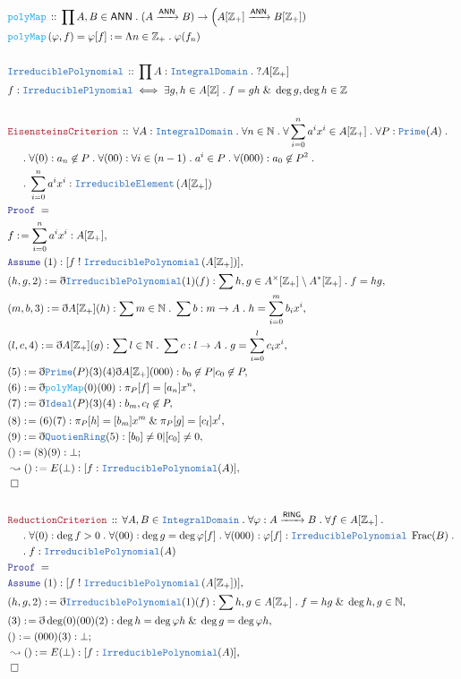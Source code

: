 \documentclass[12pt]{scrartcl}
\newcommand{\TYPE}[1]{\textcolor{NavyBlue}{\mathtt{#1}}}
\newcommand{\FUNC}[1]{\textcolor{Cerulean}{\mathtt{#1}}}
\newcommand{\LOGIC}[1]{\textcolor{Blue}{\mathtt{#1}}}
\newcommand{\THM}[1]{\textcolor{Maroon}{\mathtt{#1}}}
\renewcommand{\.}{\; . \;}
\newcommand{\de}{: \kern 0.1pc =}
\newcommand{\IsNot}{\; ! \;}
\newcommand{\Act}[1]{\left( #1 \right)}
\newcommand{\Theorem}[2]{& \THM{#1} \, :: \, #2 \\ & \Proof = \\ }
\newcommand{\DeclareType}[2]{& \TYPE{#1} \, :: \, #2 \\}
\newcommand{\DefineType}[3]{& #1 : \TYPE{#2} \iff #3 \\}
\newcommand{\DeclareFunc}[2]{& \FUNC{#1} \, :: \, #2 \\}
\newcommand{\DefineNamedFunc}[4]{&  \FUNC{#1}\Act{#2} = #3 \de #4 \\}
\newcommand{\NewLine}{\\ & \kern 1pc}
\newcommand{\Page}[1]{ \begin{align*} #1 \end{align*}   }
\newcommand{ \bd }{ \ByDef }
\renewcommand{\And}{\; \& \;}
\newcommand{\Int}{\mathbb{Z} }
\newcommand{\Nat}{\mathbb{N} }
\newcommand{\Say}[3]{& #1 \de #2 : #3, \\}
\newcommand{\Conclude}[3]{& #1 \de #2 : #3; \\}
\newcommand{\Derive}[3]{& \leadsto #1 \de #2 : #3, \\}
\newcommand{\Assume}[2]{& \LOGIC{Assume} \; #1 : #2, \\}
\newcommand{\QED}{\; \square}
\newcommand{\EndProof}{& \QED \\}
\newcommand{\ByDef}{\eth}
\newcommand{\Proof}{\LOGIC{Proof} \; }
\newcommand{\Arrow}[1]{\xrightarrow{#1}}
\newcommand{\ID}{\TYPE{IntegralDomain}}
\newcommand{\RING}{\mathsf{RING}}
\newcommand{\ANN}{\mathsf{ANN}}
\DeclareMathOperator{\Frac}{Frac}
\begin{document}
\Page{
	\DeclareFunc{polyMap}{ \prod A,B \in \ANN \. (A \Arrow{\ANN} B) \to \Big(A[\Int_+] \Arrow{\ANN} B[\Int_+])}
	\DefineNamedFunc{polyMap}{\varphi,f}{\varphi[f]}{\Lambda n \in \Int_+ \. \varphi(f_n) }
	\\
	\DeclareType{IrreduciblePolynomial}{\prod A : \ID \. ?A[\Int_+] }
	\DefineType{f}{IrreduciblePlynomial}{\exists g,h \in A[\Int] \. f = gh \And \deg g,\deg h \in \Int}
	\\
	\Theorem{EisensteinsCriterion}{ \forall A : \ID \. \forall n \in \Nat \. \forall \sum^n_{i=0} a^i x^i \in A[\Int_+] \. 
		\forall  P : \TYPE{Prime}(A) \.  \NewLine \. \forall (0) : a_n \not \in P \. \forall (00) : \forall i \in (n-1) \. a^i \in P \.
		\forall (000) : a_0 \not \in P^2 \.  \NewLine \.
		\sum^n_{i=0} a^i x^i  : \TYPE{IrreducibleElement}\left(A[\Int_+]\right)
	}
	\Say{f}{\sum^n_{i=0} a^i x^i}{ A[\Int_+]}
	\Assume{(1)}{[f \IsNot \TYPE{IrreduciblePolynomial}\left(A[\Int_+]\right)]}
	\Say{(h,g,2)}{ \bd \TYPE{IrreduciblePolynomial}(1)(f)  }{ \sum h,g \in A^\times[\Int_+] \setminus A^*[\Int_+] \. f = hg  }
	\Say{(m,b,3)}{\bd A[\Int_+](h)}{ \sum m \in \Nat \. \sum b : m \to A \. h = \sum^m_{i=0} b_ix^i}
	\Say{(l,c,4)}{\bd A[\Int_+](g)}{\sum l \in \Nat \. \sum c : l \to A \. g = \sum^l_{i=0} c_ix^i}
	\Say{(5)}{\bd \TYPE{Prime}(P)(3)(4)\bd A[\Int_+](000)}{ b_0 \not \in P | c_0 \not \in P }
	\Say{(6)}{\bd \FUNC{polyMap}(0)(00)}{ \pi_P[f] = [a_n]x^n  }
	\Say{(7)}{\bd \TYPE{Ideal}(P)(3)(4)}{b_m,c_l \not \in P}
	\Say{(8)}{(6)(7)}{  \pi_P[h] = [b_m]x^m \And \pi_P[g] =[c_l]x^l}
	\Say{(9)}{ \bd \TYPE{QuotienRing}(5) }{  [b_0] \neq 0 |  [c_0] \neq 0  }
	\Conclude{()}{ (8)(9)}{\bot}
	\Derive{()}{E(\bot)}{ [f : \TYPE{IrreduciblePolynomial}(A)]}
	\EndProof
	\\
	\Theorem{ReductionCriterion}{\forall A,B \in \ID \. \forall \varphi : A \Arrow{\RING} B \. \forall f \in A[\Int_+] \. \NewLine \.  
		\forall (0) : \deg f > 0 \. \forall (00) : \deg g = \deg \varphi[f] \. \forall  (000) : \varphi[f] : \TYPE{IrreduciblePolynomial}\;\Frac(B) \. \NewLine 
		\. f : \TYPE{IrreduciblePolynomial}(A)  
	}
	\Assume{(1)}{[f \IsNot \TYPE{IrreduciblePolynomial}\left(A[\Int_+]\right)]}
	\Say{(h,g,2)}{ \bd \TYPE{IrreduciblePolynomial}(1)(f)  }{ \sum h,g \in A[\Int_+] \. f = hg \And \deg h,g \in \Nat  }
	\Say{ (3)  }{\bd \deg (0)(00)(2)}{  \deg h = \deg \varphi h \And \deg g = \deg \varphi h}
	\Conclude{()}{(000)(3)}{\bot}
	\Derive{()}{E(\bot)}{ [f : \TYPE{IrreduciblePolynomial}(A)]}
	\EndProof
}
\newpage
\end{document}
